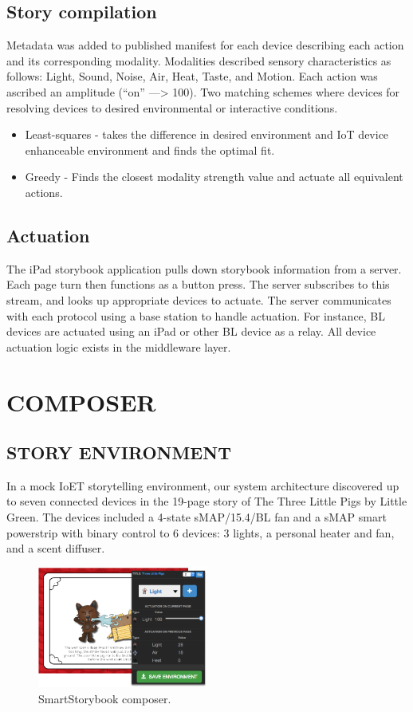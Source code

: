 \documentclass{sigchi}
\newcommand\namesp{SmartStorybook }
\begin{document}
\subsection{Story compilation}
Metadata was added to published manifest for each device describing each action and its corresponding modality. Modalities described sensory characteristics as follows: Light, Sound, Noise, Air, Heat, Taste, and Motion. Each action was ascribed an amplitude (“on” —> 100). 
Two matching schemes where devices for resolving devices to desired environmental or interactive conditions. 
\begin{itemize}
\item Least-squares - takes the difference in desired environment and IoT device enhanceable environment and finds the optimal fit. 

\item Greedy - Finds the closest modality strength value and actuate all equivalent actions. 
\end{itemize}
\subsection{Actuation}
The iPad storybook application pulls down storybook information from a server. Each page turn then functions as a button press. The server subscribes to this stream, and looks up appropriate devices to actuate. 
The server communicates with each protocol using a base station to handle actuation. For instance, BL devices are actuated using an iPad or other BL device as a relay. All device actuation logic exists in the middleware layer. 

\section{COMPOSER}
\subsection{STORY ENVIRONMENT}
In a mock IoET storytelling environment, our system architecture discovered up to seven connected devices in the 19-page story of The Three Little Pigs by Little Green. The devices included a 4-state sMAP/15.4/BL fan and a sMAP smart powerstrip with binary control to 6 devices: 3 lights, a personal heater and fan, and a scent diffuser.  
  \begin{figure}[t!]
      \centering
      \includegraphics[keepaspectratio, width=0.5\textwidth]{figures/composer.pdf} 
      \caption{\namesp composer. }
      \vspace{-4pt}
      \label{fig:architecture} 
    \end{figure}
\end{document}

